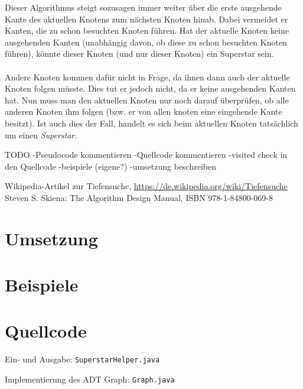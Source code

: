 \documentclass[a4paper, notitlepage, 12pt]{scrartcl}
\newenvironment{longlisting}{\captionsetup{type=listing}}{}
\begin{document}
Dieser Algorithmus steigt sozusagen immer weiter über die erste ausgehende Kante des aktuellen Knotens zum nächsten Knoten hinab. Dabei vermeidet er Kanten, die zu schon besuchten Knoten führen. Hat der aktuelle Knoten keine ausgehenden Kanten (unabhängig davon, ob diese zu schon besuchten Knoten führen), könnte dieser Knoten (und nur dieser Knoten) ein Superstar sein.
\\ \\
Andere Knoten kommen dafür nicht in Frage, da ihnen dann auch der aktuelle Knoten folgen müsste. Dies tut er jedoch nicht, da er keine ausgehenden Kanten hat. Nun muss man den aktuellen Knoten nur noch darauf überprüfen, ob alle anderen Knoten ihm folgen (bzw. er von allen knoten eine eingehende Kante besitzt). Ist auch dies der Fall, handelt es sich beim aktuellen Knoten tatsächlich um einen \textit{Superstar}.

TODO
-Pseudocode kommentieren
-Quellcode kommentieren
-visited check in den Quellcode
-beispiele (eigene?)
-umsetzung beschreiben

  \begin{thebibliography}{xx}
     Wikipedia-Artikel zur Tiefensuche, \url{https://de.wikipedia.org/wiki/Tiefensuche}
     Steven S. Skiena: The Algorithm Design Manual, ISBN 978-1-84800-069-8
  \end{thebibliography}
\section{Umsetzung}
\section{Beispiele}
\section{Quellcode}
 \renewcommand{\listingscaption}{Quellcode}

 \begin{longlisting}
 \caption{Ein- und Ausgabe: \texttt{SuperstarHelper.java}}
 \end{longlisting}

 \begin{longlisting}
 \caption{Implementierung des ADT Graph: \texttt{Graph.java}}
 \end{longlisting}

 
\end{document}
